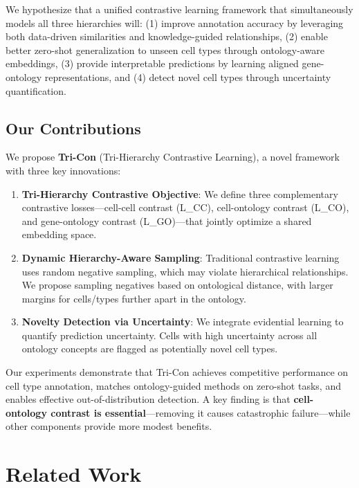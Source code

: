\documentclass[11pt]{article}
\begin{document}
We hypothesize that a unified contrastive learning framework that simultaneously models all three hierarchies will: (1) improve annotation accuracy by leveraging both data-driven similarities and knowledge-guided relationships, (2) enable better zero-shot generalization to unseen cell types through ontology-aware embeddings, (3) provide interpretable predictions by learning aligned gene-ontology representations, and (4) detect novel cell types through uncertainty quantification.

\subsection{Our Contributions}

We propose \textbf{Tri-Con} (Tri-Hierarchy Contrastive Learning), a novel framework with three key innovations:

\begin{enumerate}
    \item \textbf{Tri-Hierarchy Contrastive Objective}: We define three complementary contrastive losses---cell-cell contrast (L\_CC), cell-ontology contrast (L\_CO), and gene-ontology contrast (L\_GO)---that jointly optimize a shared embedding space.
    
    \item \textbf{Dynamic Hierarchy-Aware Sampling}: Traditional contrastive learning uses random negative sampling, which may violate hierarchical relationships. We propose sampling negatives based on ontological distance, with larger margins for cells/types further apart in the ontology.
    
    \item \textbf{Novelty Detection via Uncertainty}: We integrate evidential learning to quantify prediction uncertainty. Cells with high uncertainty across all ontology concepts are flagged as potentially novel cell types.
\end{enumerate}

Our experiments demonstrate that Tri-Con achieves competitive performance on cell type annotation, matches ontology-guided methods on zero-shot tasks, and enables effective out-of-distribution detection. A key finding is that \textbf{cell-ontology contrast is essential}---removing it causes catastrophic failure---while other components provide more modest benefits.

\section{Related Work}
\end{document}
